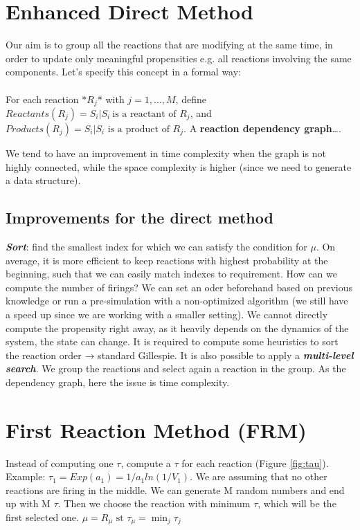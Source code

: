   \section{Enhanced Direct Method}
  Our aim is to group all the reactions that are modifying at the same time, in order to update only meaningful propensities e.g. all reactions involving the same components.
  Let's specify this concept in a formal way:
  \\
  \\
  \noindent
  For each reaction $*R_j$* with $j = 1,...,M$, define $Reactants(R_j)={S_i|S_i \ \text{is a reactant of }R_j}$, and $Products(R_j) = {S_i|S_i \text{ is a product of }R_j}$.
  A \textbf{reaction dependency graph}\ldots{}.

  We tend to have an improvement in time complexity when the graph is not highly connected, while the space complexity is higher (since we need to generate a data structure).
  \subsection{Improvements for the direct method}
  \textbf{\emph{Sort}}: find the smallest index for which we can satisfy the condition for $\mu$.
  On average, it is more efficient to keep reactions with highest probability at the beginning, such that we can easily match indexes to requirement.
  How can we compute the number of firings? We can set an oder beforehand based on previous knowledge or run a pre-simulation with a non-optimized algorithm (we still have a speed up since we are working with a smaller setting).
  We cannot directly compute the propensity right away, as it heavily depends on the dynamics of the system, the state can change.
  It is required to compute some heuristics to sort the reaction order → standard Gillespie.
  It is also possible to apply a \textbf{\emph{multi-level search}}.
  We group the reactions and select again a reaction in the group.
  As the dependency graph, here the issue is time complexity.

\section{First Reaction Method (FRM)}
Instead of computing one $\tau$, compute a $\tau$ for each reaction (Figure \ref{fig:tau}).
Example: $\tau_1 = Exp(a_1)=1/a_1ln(1/V_1)$.
We are assuming that no other reactions are firing in the middle.
We can generate M random numbers and end up with M $\tau$.
Then we choose the reaction with minimum $\tau$, which will be the first selected one.
$\mu= R_{\mu}\text{ st }\tau_{\mu}= \min_{j}\tau_j$

